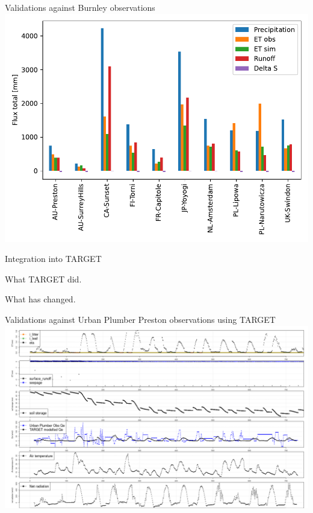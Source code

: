 \documentclass{beamer}
\begin{document}
\begin{frame}{Validations against Burnley observations} 
\includegraphics[scale=0.50]{water_balance_presunangle.pdf}
\end{frame}


\begin{frame}{Integration into TARGET} 

What TARGET did.

What has changed.

\end{frame}


\begin{frame}{Validations against Urban Plumber Preston observations using TARGET} 
\includegraphics[scale=0.20]{PrestonFeb2004_4mmIrr_ground.png}
\end{frame}
\end{document}
